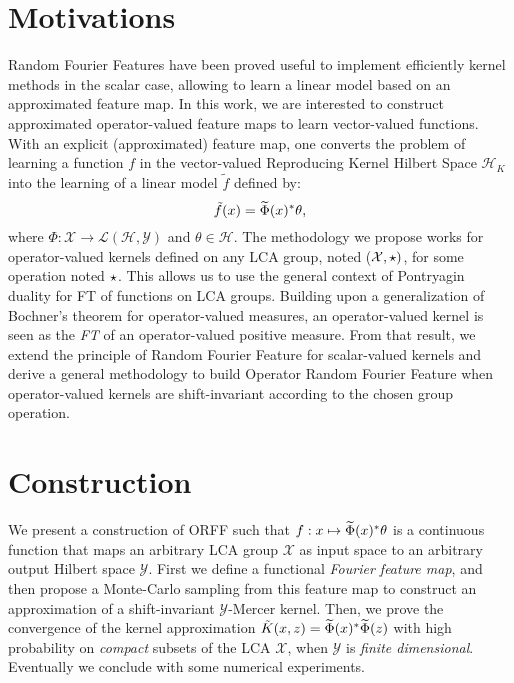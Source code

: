 \section{Motivations}
\label{sec:motivations}
Random Fourier Features have been proved useful to implement efficiently kernel methods in the scalar case, allowing to learn a linear model based on an approximated feature map. In this work, we are interested to construct approximated operator-valued feature maps to learn vector-valued functions. With an explicit (approximated) feature map, one converts the problem of learning a function $f$ in the vector-valued Reproducing Kernel Hilbert Space $\mathcal{H}_K$ into the learning of a linear model $\tilde{f}$ defined by:
 \begin{dmath*}
 \tilde{f}(x) = \tildePhi{\omega}(x)^\adjoint  \theta,
 \end{dmath*}
 where $\Phi: \mathcal{X} \to \mathcal{L}(\mathcal{H},\mathcal{Y})$ and $\theta \in \mathcal{H}$. The methodology we propose works for operator-valued kernels defined on any \acf{LCA} group, noted ($\mathcal{X}, \star)$, for some operation noted $\star$. This allows us to use the general context of Pontryagin duality for \acl{FT} of functions on \acs{LCA} groups. Building upon a generalization of Bochner's theorem for operator-valued measures, an operator-valued kernel is seen as the \emph{\acl{FT}} of an operator-valued positive measure. From that result, we extend the principle of Random Fourier Feature for scalar-valued kernels and derive a general methodology to build Operator Random Fourier Feature when operator-valued kernels are shift-invariant according to the chosen group operation.

\clearpage
\section{Construction}
\label{sec:construction}
We present a construction of \acf{ORFF} such that $f: x\mapsto \widetilde{\Phi}(x)^* \theta$ is a continuous function that maps an arbitrary \acs{LCA} group $\mathcal{X}$ as input space to an arbitrary output Hilbert space $\mathcal{Y}$. First we define a functional \emph{Fourier feature map}, and then propose a Monte-Carlo sampling from this feature map to construct an approximation of a shift-invariant $\mathcal{Y}$-Mercer kernel.
Then, we prove the convergence of the kernel approximation $\tilde{K}(x,z)=\widetilde{\Phi}(x)^* \widetilde{\Phi}(z)$ with high probability on \emph{compact} subsets of the \acs{LCA} $\mathcal{X}$, when $\mathcal{Y}$ is \emph{finite dimensional}. Eventually we conclude with some numerical experiments.
